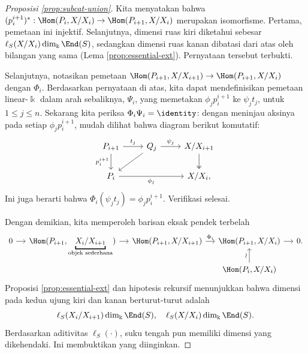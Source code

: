 \begin{proof}[Proposisi \ref{prop:subcat-union}]
	Kita menyatakan bahwa $(p^{i+1}_i)^*: \Hom(P_i, X/X_i) \to \Hom(P_{i+1}, X/X_i)$ merupakan isomorfisme. Pertama, pemetaan ini injektif. Selanjutnya, dimensi ruas kiri diketahui sebesar $\ell_S(X/X_i) \dim_{\Bbbk} \End(S)$, sedangkan dimensi ruas kanan dibatasi dari atas oleh bilangan yang sama (Lema \ref{prop:essential-ext}). Pernyataan tersebut terbukti.
	
	Selanjutnya, notasikan pemetaan $\Hom(P_{i+1}, X/X_{i+1}) \to \Hom(P_{i+1}, X/X_i)$ dengan $\Phi_i$. Berdasarkan pernyataan di atas, kita dapat mendefinisikan pemetaan linear-$\Bbbk$ dalam arah sebaliknya, $\Psi_i$, yang memetakan $\phi_j p^{i+1}_i$ ke $\psi_j t_j$, untuk $1 \leq j \leq n$. Sekarang kita periksa $\Phi_i \Psi_i = \identity$: dengan meninjau aksinya pada setiap $\phi_j p^{i+1}_i$, mudah dilihat bahwa diagram berikut komutatif:
	\[\begin{tikzcd}
		P_{i+1} \arrow[r, "{t_j}"] \arrow[d, "{p^{i+1}_i}"'] & Q_j \arrow[r, "{\psi_j}"] \arrow[ld] & X/X_{i+1} \arrow[twoheadrightarrow, d] \\
		P_i \arrow[rr, "{\phi_j}"'] & & X/X_i ,
	\end{tikzcd}\]
	Ini juga berarti bahwa $\Phi_i(\psi_j t_j) = \phi_j p^{i+1}_i$. Verifikasi selesai.
	
	Dengan demikian, kita memperoleh barisan eksak pendek terbelah
	\[\begin{tikzcd}[row sep=tiny, column sep=small]
		0 \arrow[r] & \Hom(P_{i+1}, \underbracket{X_i/X_{i+1}}_{\text{objek sederhana}}) \arrow[r] & \Hom(P_{i+1}, X/X_{i+1}) \arrow[r, "{\Phi_i}"] & \Hom(P_{i+1}, X/X_i) \arrow[r] & 0. \\
		& & & \Hom(P_i , X/X_i) \arrow[u, "\sim" sloped] &
	\end{tikzcd}\]
	Proposisi \ref{prop:essential-ext} dan hipotesis rekursif menunjukkan bahwa dimensi pada kedua ujung kiri dan kanan berturut-turut adalah
	\[ \ell_S(X_i/X_{i+1}) \dim_{\Bbbk} \End(S), \quad \ell_S(X/X_i) \dim_{\Bbbk} \End(S). \]
	Berdasarkan aditivitas $\ell_S(\cdot)$, suku tengah pun memiliki dimensi yang dikehendaki. Ini membuktikan yang diinginkan.
\end{proof}


